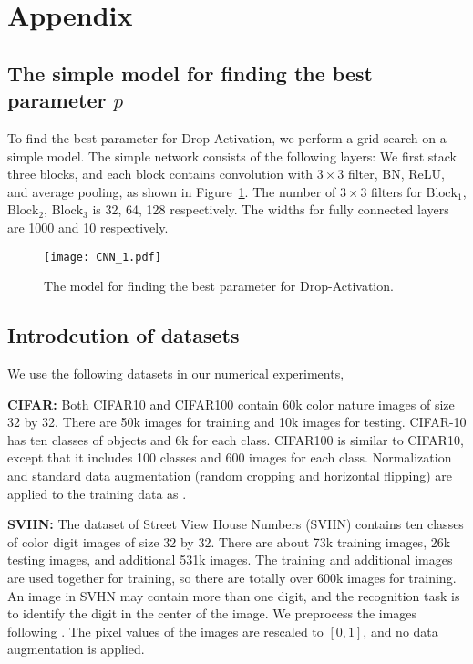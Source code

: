 \documentclass[11pt]{article}
\begin{document}
\section{Appendix}
\subsection{The simple model for finding the best parameter $p$}
To find the best parameter for Drop-Activation, we perform a grid search on a simple model. The simple network consists of the following layers: We first stack three blocks, and each block contains convolution with $3\times3$ filter, BN, ReLU, and average pooling, as shown in Figure~\ref{fig:simplemodel}. The number of $3\times 3$ filters for $\text{Block}_1$, $\text{Block}_2$, $\text{Block}_3$ is 32, 64, 128 respectively. The widths for fully connected layers are 1000 and 10 respectively.
\begin{figure}[ht]
  \centering
\texttt{[image: CNN\_1.pdf]}\\
  \caption{The model for finding the best parameter for Drop-Activation.}\label{fig:simplemodel}
\end{figure}

\subsection{Introdcution of datasets}
We use the following datasets in our numerical experiments,

\textbf{CIFAR:} Both CIFAR10 and CIFAR100 contain 60k color nature images of size 32 by 32. There are 50k images for training and 10k images for testing. CIFAR-10 has ten classes of objects and 6k for each class. CIFAR100 is similar to CIFAR10, except that it includes 100 classes and 600 images for each class. Normalization and standard data augmentation (random cropping and horizontal flipping) are applied to the training data as \cite{resnet}.


\textbf{SVHN:} The dataset of Street View House Numbers (SVHN) contains ten classes of color digit images of size 32 by 32. There are about 73k training images, 26k testing images, and additional 531k images. The training and additional images are used together for training, so there are totally over 600k images for training. An image in SVHN may contain more than one digit, and the recognition task is to identify the digit in the center of the image. We preprocess the images following \cite{wrn}. The pixel values of the images are rescaled to $[0,1]$, and no data augmentation is applied.
\end{document}
